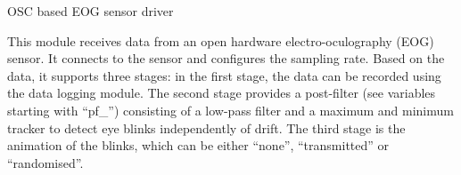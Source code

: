 OSC based EOG sensor driver


This module receives data from an open hardware electro-oculography (EOG) sensor. It connects to the sensor and configures the sampling rate. Based on the data, it supports three stages: in the first stage, the data can be recorded using the data logging module. The second stage provides a post-filter (see variables starting with ``pf\_'') consisting of a low-pass filter and a maximum and minimum tracker to detect eye blinks independently of drift. The third stage is the animation of the blinks, which can be either ``none'', ``transmitted'' or ``randomised''.





